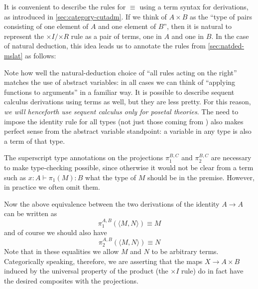 \documentclass{book}
\def\idfunc{\mathsf{id}}
\let\types\vdash
\def\type{\;\ftype}
\def\unit{\top}%
\def\ttt{\mathord{\ast}}%
\def\timesE{\ensuremath{\mathord{\times}E}}
\def\timesI{\ensuremath{\mathord{\times}I}}
\def\timesR{\ensuremath{\mathord{\times}R}}
\def\pair#1#2{\langle #1,#2\rangle}
\def\pr#1#2#3{\pi_{#1}^{#2,#3}}
\begin{document}
It is convenient to describe the rules for $\equiv$ using a term syntax for derivations, as introduced in \cref{sec:category-cutadm}.
If we think of $A\times B$ as the ``type of pairs consisting of one element of $A$ and one element of $B$'', then it is natural to represent the $\timesI/\timesR$ rule as a pair of terms, one in $A$ and one in $B$.
In the case of natural deduction, this idea leads us to annotate the rules from \cref{sec:natded-mslat} as follows:
Note how well the natural-deduction choice of ``all rules acting on the right'' matches the use of abstract variables: in all cases we can think of ``applying functions to arguments'' in a familiar way.
It is possible to describe sequent calculus derivations using terms as well, but they are less pretty.
For this reason, \emph{we will henceforth use sequent calculus only for posetal theories}.
The need to impose the identity rule for all types (not just those coming from \cG) also makes perfect sense from the abstract variable standpoint: a variable in any type is also a term of that type.

The superscript type annotations on the projections $\pr1BC$ and $\pr2BC$ are necessary to make type-checking possible, since otherwise it would not be clear from a term such as $x:A \types \pi_1(M):B$ what the type of $M$ should be in the premise.
However, in practice we often omit them.

Now the above equivalence between the two derivations of the identity $A\to A$ can be written as
\begin{equation}
  \pr1AB(\pair M N) \equiv M\label{eq:beta-prodcat-1}
\end{equation}
and of course we should also have
\begin{equation}
  \pr2AB(\pair M N) \equiv N\label{eq:beta-prodcat-2}
\end{equation}
Note that in these equalities we allow $M$ and $N$ to be arbitrary terms.
Categorically speaking, therefore, we are asserting that the maps $X\to A\times B$ induced by the universal property of the product (the $\timesI$ rule) do in fact have the desired composites with the projections.
\end{document}
